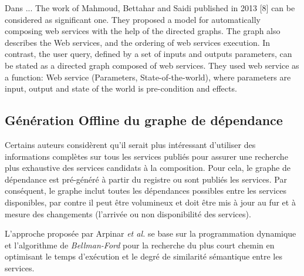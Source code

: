   \begin{text}
    Dans \cite{mahmoud2013towards} ... %
    The work of Mahmoud, Bettahar and Saidi published in 2013 [8] can
    be considered as significant one. They proposed a model for
    automatically composing web services with the help of the directed
    graphs. The graph also describes the Web services, and the
    ordering of web services execution. In contrast, the user query,
    defined by a set of inputs and outputs parameters, can be stated
    as a directed graph composed of web services. They used web
    service as a function: Web service (Parameters,
    State-of-the-world), where parameters are input, output and state
    of the world is pre-condition and effects.
  \end{text}

  \subsection{Génération Offline du graphe de dépendance}
  \label{sec:gener-offline}
  \begin{text}
    Certains auteurs considèrent qu'il serait plus intéressant
    d'utiliser des informations complètes sur tous les services
    publiés pour assurer une recherche plus exhaustive des services
    candidats à la composition. Pour cela, le graphe de dépendance
    est pré-généré à partir du registre ou sont publiés les
    services. Par conséquent, le graphe inclut toutes les dépendances
    possibles entre les services disponibles, par contre il peut être
    volumineux et doit être mis à jour au fur et à mesure des
    changements (l'arrivée ou non disponibilité des services).
  \end{text}

  \begin{text}
    L'approche proposée par Arpinar \textit{et al.}
    \cite{arpinar2005ontology} se base sur la programmation dynamique
    et l'algorithme de \textit{Bellman-Ford} pour la recherche du plus
    court chemin en optimisant le temps d'exécution et le degré de
    similarité sémantique entre les services.

  \end{text}

